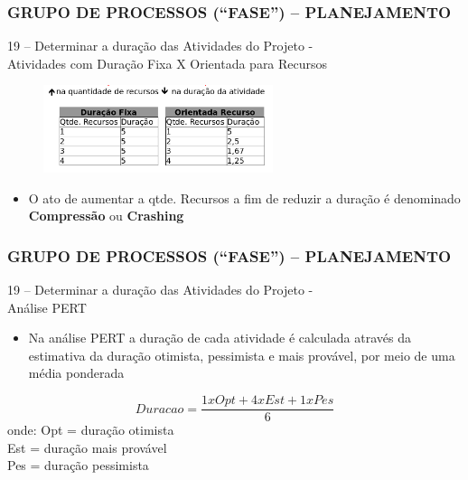 \begin{frame}
 \frametitle{GRUPO DE PROCESSOS (“FASE”) – PLANEJAMENTO}
19 – Determinar a duração das Atividades do Projeto - \\
Atividades com Duração Fixa X Orientada para Recursos
  \begin{figure}
   \centering
   \includegraphics[width = 0.6\textwidth]{figs/fig3.png}
  \end{figure}
  \begin{itemize}
   \item O ato de aumentar a qtde. Recursos a fim de reduzir a duração é denominado \textbf{Compressão} ou \textbf{Crashing}
  \end{itemize}
\end{frame}

\begin{frame}
 \frametitle{GRUPO DE PROCESSOS (“FASE”) – PLANEJAMENTO}
19 – Determinar a duração das Atividades do Projeto - \\
Análise PERT
  \begin{itemize}
   \item Na análise PERT a duração de cada atividade é calculada através da estimativa da duração otimista, pessimista e mais provável, por meio de uma média ponderada
  \end{itemize}
  \begin{equation}
   Duracao = \frac{1 x Opt + 4 x Est + 1 x Pes }{6}
  \end{equation}
onde: Opt = duração otimista\\
               Est = duração mais provável\\
               Pes = duração pessimista
\end{frame}

